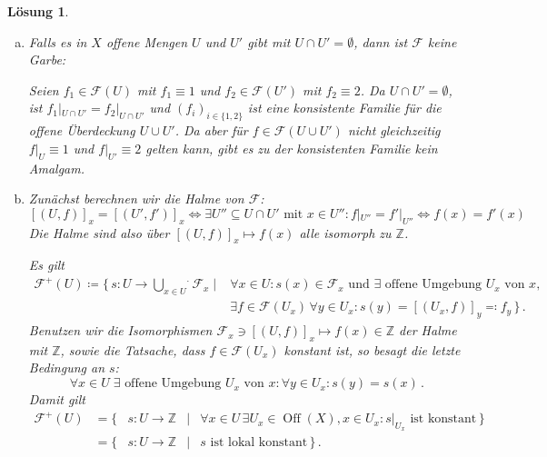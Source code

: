 \documentclass[a4paper, 12pt, numbers=noendperiod, chapterprefix=true]{scrbook}
\theoremstyle{break}
\newtheorem{Loes}{L\"osung}
\theoremstyle{nonumberbreak}
\theoremstyle{nonumberplain}
\DeclareMathOperator{\Off}{Off}
\newcommand{\Z}{\mathbb{Z}}
\begin{document}
\begin{Loes}
\begin{enumerate}[a)]%
 \item Falls es in $X$ offene Mengen $U$ und $U'$ gibt mit $U \cap U' = \emptyset$, dann ist $\mathcal{F}$ keine Garbe:
 
 Seien $f_1 \in \mathcal{F}(U)$ mit $f_1 \equiv 1$ und $f_2 \in \mathcal{F}(U')$ mit $f_2 \equiv 2$. Da $U \cap U' = \emptyset$, ist $f_1|_{U \cap U'} = {f_2}|_{ U \cap U'}$ und $(f_i)_{i\in \{1,2\}}$ ist eine konsistente Familie f\"ur die offene \"Uberdeckung $U \cup U'$. Da aber f\"ur $f \in \mathcal{F}(U \cup U')$ nicht gleichzeitig $f|_U \equiv 1$ und $f|_{U'} \equiv 2$ gelten kann, gibt es zu der konsistenten Familie kein Amalgam.
 
 \item Zun\"achst berechnen wir die Halme von $\mathcal{F}$: 
 $$[(U,f)]_x = [(U',f')]_x \Leftrightarrow \exists U'' \subseteq U \cap U' \textrm{ mit } x \in U'' : f|_{U''} = f'|_{U''} \Leftrightarrow f(x) = f'(x)$$
 Die Halme sind also \"uber $[(U,f)]_x \mapsto f(x)$ alle isomorph zu $\Z$.
 
 Es gilt 
 $$\begin{array}{cl}
    \mathcal{F}^+(U) \coloneqq \{ \, s \colon U \to \stackrel{.}{\bigcup\limits_{x \in U}} \mathcal{F}_x \mid 
    & \forall x \in U : s(x) \in \mathcal{F}_x \textrm{ und } \exists \textrm{ offene Umgebung } U_x \textrm{ von } x, \\
    & \exists f \in \mathcal{F}(U_x) \, \forall y \in U_x : s(y) = [(U_x,f)]_y \eqqcolon f_y \, \} \, .
   \end{array}$$
 Benutzen wir die Isomorphismen $\mathcal{F}_x \ni [(U,f)]_x \mapsto f(x) \in \Z$ der Halme mit $\Z$, sowie die Tatsache, dass $f \in \mathcal{F}(U_x)$ konstant ist, so besagt die letzte Bedingung an $s$:
 $$\forall x \in U \; \exists \textrm{ offene Umgebung } U_x \textrm{ von } x: \forall y \in U_x: s(y) = s(x) \, .$$
 Damit gilt
  $$\begin{array}{rcccl}
    \mathcal{F}^+(U) &= \{ & s \colon U \to \Z &\mid 
    & \forall x \in U \, \exists U_x \in \Off(X), x \in U_x : s|_{U_x} \textrm{ ist konstant}\, \}\\
    &= \{ & s \colon U \to \Z & \mid & s \textrm{ ist lokal konstant} \, \} \, .
   \end{array}$$
\end{enumerate}
\end{Loes}
\end{document}
